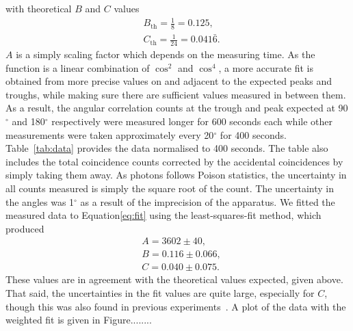 \documentclass[twocolumn]{article}
\begin{document}
with theoretical $B$ and $C$ values~\cite{sieg}
\begin{align*}
&B_{\text{th}} = \frac{1}{8} = 0.125,\\
&C_{\text{th}} = \frac{1}{24} = 0.041\bar{6}.
\end{align*}
$A$ is a simply scaling factor which depends on the measuring time. As the function is a linear combination of $\cos^2$ and $\cos^4$, a more accurate fit is obtained from more precise values on and adjacent to the expected peaks and troughs, while making sure there are sufficient values measured in between them. As a result, the angular correlation counts at the trough and peak expected at 90$^{\circ}$ and 180$^{\circ}$ respectively were measured longer for 600 seconds each while other measurements were taken approximately every 20$^{\circ}$ for 400 seconds. Table~\ref{tab:data} provides the data normalised to 400 seconds. The table also includes the total coincidence counts corrected by the accidental coincidences by simply taking them away. As photons follows Poison statistics, the uncertainty in all counts measured is simply the square root of the count. The uncertainty in the angles was 1$^\circ$ as a result of the imprecision of the apparatus. We fitted the measured data to Equation\ref{eq:fit} using the least-squares-fit method, which produced
\begin{align*}
&A = 3602 \pm 40,\\
&B = 0.116  \pm 0.066,\\
&C = 0.040 \pm 0.075.
\end{align*}
These values are in agreement with the theoretical values expected, given above. That said, the uncertainties in the fit values are quite large, especially for $C$, though this was also found in previous experiments~\cite{meliss}. A plot of the data with the weighted fit is given in Figure........
\end{document}
